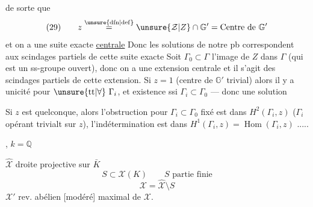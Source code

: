 de sorte que
\[
(29)\qquad z\overset{\unsure{\mathrm{dfn}|\mathrm{def}}}{=}\unsure{\mathcal Z|Z}\cap\mathbb G'=\text{Centre de }\mathbb G'
\]
et on a une suite exacte \uline{centrale}
Donc les solutions de notre pb  correspondent aux scindages partiels de cette suite exacte
Soit $\Gamma_0\subset\Gamma$ l'image de $Z$ dans $\Gamma$
(qui est un ss-groupe ouvert), donc on a une extension centrale
et il s'agit des scindages partiels de cette extension. Si $z=1$
(centre de $\mathbb G'$ trivial) alors il y a unicité pour $\unsure{\mathrm{tt}|\forall}\ \Gamma_i$, et existence ssi $\Gamma_i\subset\Gamma_0$ --- donc une solution  

Si $z$ est quelconque, alors l'obstruction pour $\Gamma_i\subset\Gamma_0$ fixé est dans $H^2(\Gamma_i,z)$
($\Gamma_i$ opérant trivialt sur $z$), l'indétermination est dans
$H^1(\Gamma_i,z)=\operatorname{Hom}(\Gamma_i,z)$ .....


, $k=\mathbb Q$

$\widehat{\mathcal X}$ droite projective sur $\bar K$
\[
S\subset\mathcal X(K)\qquad S\text{ partie finie}
\]
\[
\mathcal X=\widehat{\mathcal X}\setminus S
\]
$\mathcal X'$ rev. abélien [modéré] maximal de $\mathcal X$.

